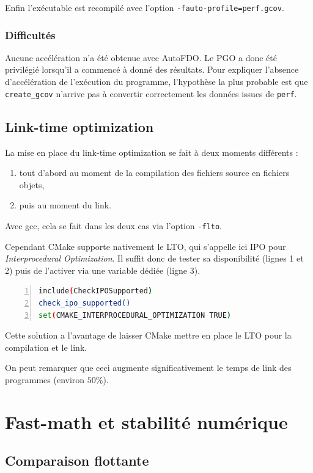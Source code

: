 \documentclass[a4paper,11pt]{report}
\begin{document}
Enfin l'exécutable est recompilé avec l'option \verb'-fauto-profile=perf.gcov'.

\subsubsection{Difficultés}
Aucune accélération n'a été obtenue avec AutoFDO.
Le PGO a donc été privilégié lorsqu'il a commencé à donné des résultats.
Pour expliquer l'absence d'accélération de l'exécution du programme, l'hypothèse la plus probable est que \verb'create_gcov' n'arrive pas à convertir correctement les données issues de \verb'perf'.

\subsection{Link-time optimization}
La mise en place du link-time optimization se fait à deux moments différents :
\begin{enumerate}
    \item tout d'abord au moment de la compilation des fichiers source en fichiers objets,
    \item puis au moment du link.
\end{enumerate}
Avec gcc, cela se fait dans les deux cas via l'option \verb'-flto'.

Cependant CMake supporte nativement le LTO, qui s'appelle ici IPO pour \emph{Interprocedural Optimization}.
Il suffit donc de tester sa disponibilité (lignes 1 et 2) puis de l'activer via une variable dédiée (ligne 3).
\begin{lstlisting}[language=bash,numbers=left]
include(CheckIPOSupported)
check_ipo_supported()
set(CMAKE_INTERPROCEDURAL_OPTIMIZATION TRUE)
\end{lstlisting}
Cette solution a l'avantage de laisser CMake mettre en place le LTO pour la compilation et le link.

On peut remarquer que ceci augmente significativement le temps de link des programmes (environ $50\%$).

\section{Fast-math et stabilité numérique}
\subsection{Comparaison flottante}
\end{document}
